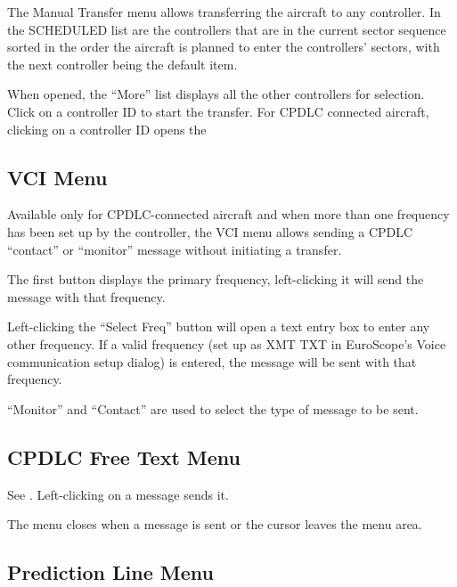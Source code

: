 \documentclass[a4paper,oneside,11pt]{memoir}
\begin{document}

The Manual Transfer menu allows transferring the aircraft to any controller. In the SCHEDULED list are the controllers that are in the current sector sequence sorted in the order the aircraft is planned to enter the controllers’ sectors, with the next controller being the default item.

\bigskip

When opened, the “More” list displays all the other controllers for selection. Click on a controller ID to start the transfer. For CPDLC connected aircraft, clicking on a controller ID opens the 

\subsection{VCI Menu}
\label{menu:vci}


Available only for CPDLC-connected aircraft and when more than one frequency has been set up by the controller, the VCI menu allows sending a CPDLC “contact” or “monitor” message without initiating a transfer.

\bigskip

The first button displays the primary frequency, left-clicking it will send the message with that frequency.

\bigskip

Left-clicking the “Select Freq” button will open a text entry box to enter any other frequency. If a valid frequency (set up as XMT TXT in EuroScope’s Voice communication setup dialog) is entered, the message will be sent with that frequency.

\bigskip

“Monitor” and “Contact” are used to select the type of message to be sent.

\subsection{CPDLC Free Text Menu}
\label{menu:dlftm}

See . Left-clicking on a message sends it.

\bigskip

The menu closes when a message is sent or the cursor leaves the menu area.

\subsection{Prediction Line Menu}
\label{menu:prl}
\end{document}
